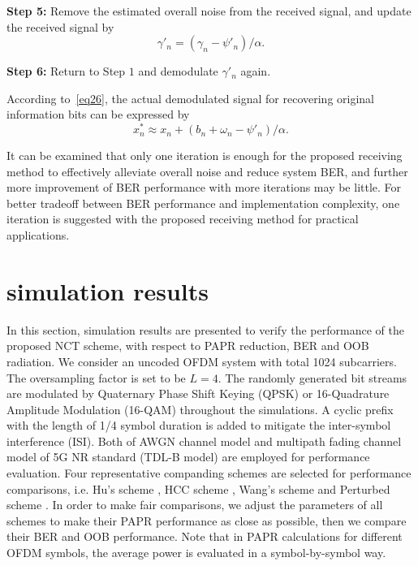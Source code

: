 \documentclass{ccjnl}
\begin{document}
\textbf{Step 5:} Remove the estimated overall noise from the received signal, and update the received signal by 
\begin{equation}
{\gamma '_n} = ({\gamma _n} - {\psi '_n})/\alpha .
\label{eq26}
\end{equation}

\textbf{Step 6:} Return to Step $1$ and demodulate ${\gamma '_n}$ again.

According to~\eqref{eq26}, the actual demodulated signal for recovering original information bits can be expressed by
\begin{equation}
x_n^ *  \approx {x_n} + ({b_n} + {\omega _n} - {\psi '_n})/\alpha .
\label{eq27}
\end{equation}

It can be examined that only one iteration is enough for the proposed receiving method to effectively alleviate overall noise and reduce system BER, and further more improvement of BER performance with more iterations may be little. For better tradeoff between BER performance and implementation complexity, one iteration is suggested with the proposed receiving method for practical applications.

\section{simulation results}
\label{SIMULATION-RESULTS}

In this section, simulation results are presented to verify the performance of the proposed NCT scheme, with respect to PAPR reduction, BER and OOB radiation. We consider an uncoded OFDM system with total 1024 subcarriers. The oversampling factor is set to be $L = 4$. The randomly generated bit streams are modulated by Quaternary Phase Shift Keying (QPSK) or 16-Quadrature Amplitude Modulation (16-QAM) throughout the simulations. A cyclic prefix with the length of 1/4 symbol duration is added to mitigate the inter-symbol interference (ISI). Both of AWGN channel model and multipath fading channel model of 5G NR standard (TDL-B model) \cite{29} are employed for performance evaluation. Four representative companding schemes are selected for performance comparisons, i.e. Hu's scheme \cite{12}, HCC scheme \cite{16}, Wang's scheme \cite{21} and Perturbed scheme \cite{23}. In order to make fair comparisons, we adjust the parameters of all schemes to make their PAPR performance as close as possible, then we compare their BER and OOB performance. Note that in PAPR calculations for different OFDM symbols, the average power is evaluated in a symbol-by-symbol way.
\end{document}
